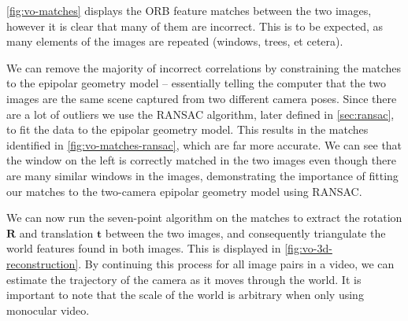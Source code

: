 \autoref{fig:vo-matches} displays the ORB feature matches between the two images, however it is clear that many of them are incorrect. This is to be expected, as many elements of the images are repeated (windows, trees, et cetera).

We can remove the majority of incorrect correlations by constraining the matches to the epipolar geometry model – essentially telling the computer that the two images are the same scene captured from two different camera poses. Since there are a lot of outliers we use the RANSAC algorithm, later defined in \autoref{sec:ransac}, to fit the data to the epipolar geometry model. This results in the matches identified in \autoref{fig:vo-matches-ransac}, which are far more accurate. We can see that the window on the left is correctly matched in the two images even though there are many similar windows in the images, demonstrating the importance of fitting our matches to the two-camera epipolar geometry model using RANSAC.

We can now run the seven-point algorithm \autocite{Hartley2004} on the matches to extract the rotation $\mathbf{R}$ and translation $\mathbf{t}$ between the two images, and consequently triangulate the world features found in both images. This is displayed in \autoref{fig:vo-3d-reconstruction}. By continuing this process for all image pairs in a video, we can estimate the trajectory of the camera as it moves through the world. It is important to note that the scale of the world is arbitrary when only using monocular video.


